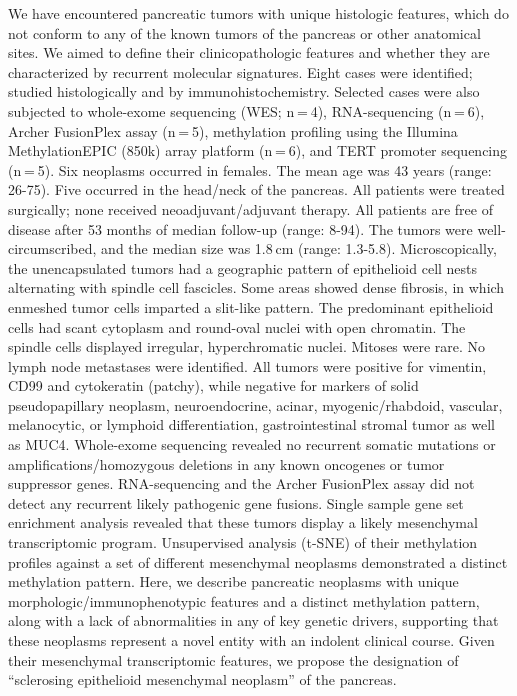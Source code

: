 \documentclass[]{article}
\begin{document}
We have encountered pancreatic tumors with unique histologic features,
which do not conform to any of the known tumors of the pancreas or other
anatomical sites. We aimed to define their clinicopathologic features
and whether they are characterized by recurrent molecular signatures.
Eight cases were identified; studied histologically and by
immunohistochemistry. Selected cases were also subjected to whole-exome
sequencing (WES; n = 4), RNA-sequencing (n = 6), Archer FusionPlex assay
(n = 5), methylation profiling using the Illumina MethylationEPIC (850k)
array platform (n = 6), and TERT promoter sequencing (n = 5). Six
neoplasms occurred in females. The mean age was 43 years (range: 26-75).
Five occurred in the head/neck of the pancreas. All patients were
treated surgically; none received neoadjuvant/adjuvant therapy. All
patients are free of disease after 53 months of median follow-up (range:
8-94). The tumors were well-circumscribed, and the median size was
1.8 cm (range: 1.3-5.8). Microscopically, the unencapsulated tumors had
a geographic pattern of epithelioid cell nests alternating with spindle
cell fascicles. Some areas showed dense fibrosis, in which enmeshed
tumor cells imparted a slit-like pattern. The predominant epithelioid
cells had scant cytoplasm and round-oval nuclei with open chromatin. The
spindle cells displayed irregular, hyperchromatic nuclei. Mitoses were
rare. No lymph node metastases were identified. All tumors were positive
for vimentin, CD99 and cytokeratin (patchy), while negative for markers
of solid pseudopapillary neoplasm, neuroendocrine, acinar,
myogenic/rhabdoid, vascular, melanocytic, or lymphoid differentiation,
gastrointestinal stromal tumor as well as MUC4. Whole-exome sequencing
revealed no recurrent somatic mutations or amplifications/homozygous
deletions in any known oncogenes or tumor suppressor genes.
RNA-sequencing and the Archer FusionPlex assay did not detect any
recurrent likely pathogenic gene fusions. Single sample gene set
enrichment analysis revealed that these tumors display a likely
mesenchymal transcriptomic program. Unsupervised analysis (t-SNE) of
their methylation profiles against a set of different mesenchymal
neoplasms demonstrated a distinct methylation pattern. Here, we describe
pancreatic neoplasms with unique morphologic/immunophenotypic features
and a distinct methylation pattern, along with a lack of abnormalities
in any of key genetic drivers, supporting that these neoplasms represent
a novel entity with an indolent clinical course. Given their mesenchymal
transcriptomic features, we propose the designation of ``sclerosing
epithelioid mesenchymal neoplasm'' of the pancreas.
\end{document}
